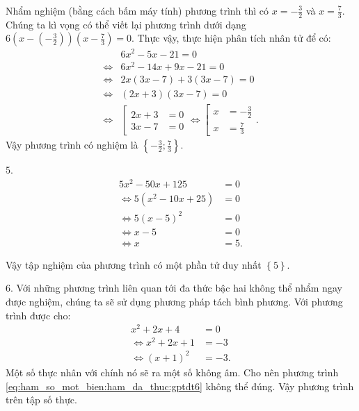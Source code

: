 Nhẩm nghiệm (bằng cách bấm máy tính) phương trình thì có $x = -\frac{3}{2}$ và $x = \frac{7}{3}$. Chúng ta kì vọng có thể viết lại phương trình dưới dạng $6\left(x - \left(-\frac{3}{2}\right)\right)\left(x - \frac{7}{3}\right) = 0$. Thực vậy, thực hiện phân tích nhân tử để có:
\begin{align*}
   &6x^2 - 5x - 21 = 0 \\
   \iff &6x^2 - 14x + 9x - 21 = 0 \\
   \iff &2x(3x - 7) + 3(3x - 7) = 0 \\
   \iff &(2x + 3)(3x - 7) = 0 \\
   \iff &\left[
      \begin{aligned}
         2x + 3 &= 0 \\
         3x - 7 &= 0
      \end{aligned}
   \right.
   \iff \left[
      \begin{aligned}
         x &= -\frac{3}{2} \\
         x &= \frac{7}{3}
      \end{aligned}
   \right..
\end{align*}
Vậy phương trình có nghiệm là $\boxed{\displaystyle\left\{-\frac{3}{2}; \frac{7}{3}\right\}}$.

5.
\begin{align*}
   5x^2 - 50x + 125 &= 0 \\
   \iff 5\left(x^2 - 10x + 25\right) &= 0 \\
   \iff 5(x - 5)^2 &= 0 \\
   \iff x - 5 &= 0 \\
   \iff x &= 5.
\end{align*}

Vậy tập nghiệm của phương trình có một phần tử duy nhất $\boxed{\displaystyle\left\{5\right\}}$.

6. Với những phương trình liên quan tới đa thức bậc hai không thể nhẩm ngay được nghiệm, chúng ta sẽ sử dụng phương pháp tách bình phương. Với phương trình được cho:
\begin{align}
   x^2 + 2x + 4 &= 0 \nonumber\\ 
   \iff x^2 + 2x + 1 &= -3 \nonumber\\
   \iff (x + 1)^2 &= -3. \label{eq:ham_so_mot_bien:ham_da_thuc:gptdt6}
\end{align}
Một số thực nhân với chính nó sẽ ra một số không âm. Cho nên phương trình \ref{eq:ham_so_mot_bien:ham_da_thuc:gptdt6} không thể đúng. Vậy phương trình  trên tập số thực.

